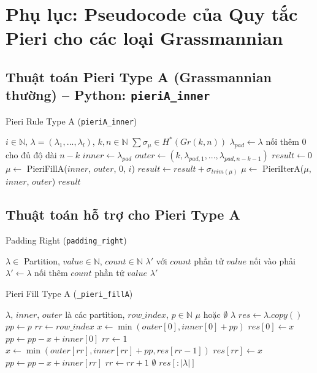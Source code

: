 \section*{Phụ lục: Pseudocode của Quy tắc Pieri cho các loại Grassmannian} \label{appendix:pseudocode}


\subsection*{Thuật toán Pieri Type A (Grassmannian thường) -- Python: \texttt{pieriA\_inner}}

\begin{algorithm}[H]
\caption{Pieri Rule Type A (\texttt{pieriA\_inner})}
\begin{algorithmic}[1]
\REQUIRE $i \in \mathbb{N}$, $\lambda = (\lambda_1, ..., \lambda_l)$, $k, n \in \mathbb{N}$
\ENSURE $\sum \sigma_\mu \in H^*(Gr(k,n))$
\STATE $\lambda_{pad} \gets \lambda$ nối thêm $0$ cho đủ độ dài $n-k$
\STATE $inner \gets \lambda_{pad}$
\STATE $outer \gets (k, \lambda_{pad,1}, ..., \lambda_{pad,n-k-1})$
\STATE $result \gets 0$
\STATE $\mu \gets$ PieriFillA($inner$, $outer$, $0$, $i$)
\WHILE{$\mu \neq \emptyset$}
    \STATE $result \gets result + \sigma_{trim(\mu)}$
    \STATE $\mu \gets$ PieriIterA($\mu$, $inner$, $outer$)
\ENDWHILE
\RETURN $result$
\end{algorithmic}
\end{algorithm}

\subsection*{Thuật toán hỗ trợ cho Pieri Type A}

\begin{algorithm}[H]
\caption{Padding Right (\texttt{padding\_right})}
\begin{algorithmic}[1]
\REQUIRE $\lambda \in$ Partition, $value \in \mathbb{N}$, $count \in \mathbb{N}$
\ENSURE $\lambda'$ với $count$ phần tử $value$ nối vào phải
\STATE $\lambda' \gets \lambda$ nối thêm $count$ phần tử $value$
\RETURN $\lambda'$
\end{algorithmic}
\end{algorithm}

\begin{algorithm}[H]
\caption{Pieri Fill Type A (\texttt{\_pieri\_fillA})}
\begin{algorithmic}[1]
\REQUIRE $\lambda$, $inner$, $outer$ là các partition, $row\_index$, $p \in \mathbb{N}$
\ENSURE $\mu$ hoặc $\emptyset$
\IF{$\lambda = \emptyset$}
    \RETURN $\lambda$
\ENDIF
\STATE $res \gets \lambda.copy()$
\STATE $pp \gets p$
\STATE $rr \gets row\_index$
    \STATE $x \gets \min(outer[0], inner[0] + pp)$
    \STATE $res[0] \gets x$
    \STATE $pp \gets pp - x + inner[0]$
    \STATE $rr \gets 1$
\ENDIF
{}
    \STATE $x \gets \min(outer[rr], inner[rr] + pp, res[rr-1])$
    \STATE $res[rr] \gets x$
    \STATE $pp \gets pp - x + inner[rr]$
    \STATE $rr \gets rr + 1$
\ENDWHILE
{}
    \RETURN $\emptyset$
\ENDIF
\RETURN $res[:|\lambda|]$
\end{algorithmic}
\end{algorithm}

